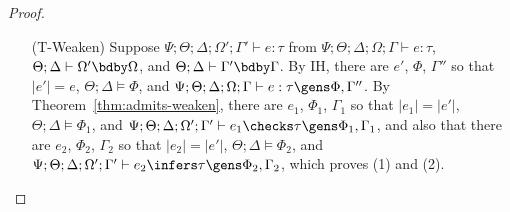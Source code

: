 \begin{proof}
\begin{itemize}
  \item[(T-Weaken)] Suppose $\Psi ; \Theta ; \Delta ; \Omega' ; \Gamma' \vdash e : \tau$ from $\Psi ; \Theta ; \Delta ; \Omega ; \Gamma \vdash e : \tau$, $\Theta ; \Delta \vdash \Omega' \bdby \Omega$, and $\Theta ; \Delta \vdash \Gamma' \bdby \Gamma$. By IH, there are $e'$, $\Phi$, $\Gamma''$ so that $|e'| = e$, $\Theta ; \Delta \vDash \Phi$, and $\Psi ; \Theta ; \Delta ; \Omega ; \Gamma \vdash e : \tau \gens \Phi, \Gamma''$. By Theorem~\ref{thm:admits-weaken}, there are $e_1$, $\Phi_1$, $\Gamma_1$ so that $|e_1| = |e'|$, $\Theta ; \Delta \vDash \Phi_1$, and $\Psi ; \Theta ; \Delta ; \Omega' ; \Gamma' \vdash e_1 \checks \tau \gens \Phi_1,\Gamma_1$, and also that there are $e_2$, $\Phi_2$, $\Gamma_2$ so that $|e_2| = |e'|$, $\Theta ; \Delta \vDash \Phi_2$, and $\Psi ; \Theta ; \Delta ; \Omega' ; \Gamma' \vdash e_2 \infers \tau \gens \Phi_2,\Gamma_2$, which proves (1) and (2).
 
\end{itemize}

\end{proof}